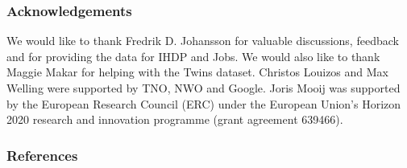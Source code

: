 \documentclass{article}
\begin{document}
\subsubsection*{Acknowledgements}
We would like to thank Fredrik D. Johansson for valuable discussions, feedback and for providing the data for IHDP and Jobs. We would also like to thank Maggie Makar for helping with the Twins dataset. Christos Louizos and Max Welling were supported by TNO, NWO and Google. Joris Mooij was supported by the European Research Council (ERC) under the European Union's Horizon 2020 research and innovation programme (grant agreement 639466).



\subsubsection*{References}
\begingroup
\renewcommand{\section}[2]{}%
{\small{
% 

}}
\endgroup
 \appendix
 \section*{Appendix}
 
\end{document}
